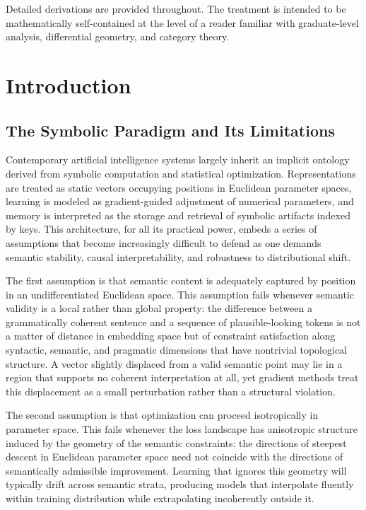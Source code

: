 \documentclass[12pt, a4paper, openany]{book}
\theoremstyle{plain}
\theoremstyle{definition}
\theoremstyle{remark}
\begin{document}
Detailed derivations are provided throughout. The treatment is intended to be mathematically self-contained at the level of a reader familiar with graduate-level analysis, differential geometry, and category theory.

\tableofcontents

\chapter{Introduction}

\section{The Symbolic Paradigm and Its Limitations}

Contemporary artificial intelligence systems largely inherit an implicit ontology derived from symbolic computation and statistical optimization. Representations are treated as static vectors occupying positions in Euclidean parameter spaces, learning is modeled as gradient-guided adjustment of numerical parameters, and memory is interpreted as the storage and retrieval of symbolic artifacts indexed by keys. This architecture, for all its practical power, embeds a series of assumptions that become increasingly difficult to defend as one demands semantic stability, causal interpretability, and robustness to distributional shift.

The first assumption is that semantic content is adequately captured by position in an undifferentiated Euclidean space. This assumption fails whenever semantic validity is a local rather than global property: the difference between a grammatically coherent sentence and a sequence of plausible-looking tokens is not a matter of distance in embedding space but of constraint satisfaction along syntactic, semantic, and pragmatic dimensions that have nontrivial topological structure. A vector slightly displaced from a valid semantic point may lie in a region that supports no coherent interpretation at all, yet gradient methods treat this displacement as a small perturbation rather than a structural violation.

The second assumption is that optimization can proceed isotropically in parameter space. This fails whenever the loss landscape has anisotropic structure induced by the geometry of the semantic constraints: the directions of steepest descent in Euclidean parameter space need not coincide with the directions of semantically admissible improvement. Learning that ignores this geometry will typically drift across semantic strata, producing models that interpolate fluently within training distribution while extrapolating incoherently outside it.
\end{document}
